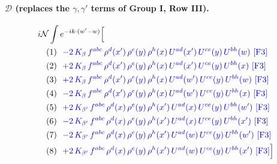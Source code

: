 \documentclass[10pt]{article}
\numberwithin{equation}{section}
\newcommand{\NN}{\mathcal N}
\begin{document}
\paragraph{$\mathcal D$ (replaces the $\gamma,\gamma'$ terms of Group I, Row III).}
\begin{align*}
&i\NN\int e^{-ik\cdot(w'-w)}\Big[\\
&\quad\text{(1)}\ \ \textcolor{blue}{-2\,K_{\beta}\,f^{abc}\,\rho^{d}(x')\,\rho^{e}(y)\,\rho^{h}(x)\,U^{ad}(x')\,U^{ce}(y)\,U^{bh}(w)}\ \text{\textcolor{blue}{[F3]}}\\
&\quad\text{(2)}\ \ \textcolor{blue}{+2\,K_{\beta}\,f^{abc}\,\rho^{d}(x')\,\rho^{e}(y)\,\rho^{h}(x)\,U^{ad}(x')\,U^{ce}(y)\,U^{bh}(x)}\ \text{\textcolor{blue}{[F3]}}\\
&\quad\text{(3)}\ \ \textcolor{blue}{+2\,K_{\beta}\,f^{abc}\,\rho^{d}(x')\,\rho^{e}(y)\,\rho^{h}(x)\,U^{ad}(w')\,U^{ce}(y)\,U^{bh}(w)}\ \text{\textcolor{blue}{[F3]}}\\
&\quad\text{(4)}\ \ \textcolor{blue}{-2\,K_{\beta}\,f^{abc}\,\rho^{d}(x')\,\rho^{e}(y)\,\rho^{h}(x)\,U^{ad}(w')\,U^{ce}(y)\,U^{bh}(x)}\ \text{\textcolor{blue}{[F3]}}\\
&\quad\text{(5)}\ \ \textcolor{blue}{+2\,K_{\beta'}\,f^{abc}\,\rho^{d}(x)\,\rho^{e}(y)\,\rho^{h}(x')\,U^{ad}(x)\,U^{ce}(y)\,U^{bh}(w')}\ \text{\textcolor{blue}{[F3]}}\\
&\quad\text{(6)}\ \ \textcolor{blue}{-2\,K_{\beta'}\,f^{abc}\,\rho^{d}(x)\,\rho^{e}(y)\,\rho^{h}(x')\,U^{ad}(x)\,U^{ce}(y)\,U^{bh}(x')}\ \text{\textcolor{blue}{[F3]}}\\
&\quad\text{(7)}\ \ \textcolor{blue}{-2\,K_{\beta'}\,f^{abc}\,\rho^{d}(x)\,\rho^{e}(y)\,\rho^{h}(x')\,U^{ad}(w)\,U^{ce}(y)\,U^{bh}(w')}\ \text{\textcolor{blue}{[F3]}}\\
&\quad\text{(8)}\ \ \textcolor{blue}{+2\,K_{\beta'}\,f^{abc}\,\rho^{d}(x)\,\rho^{e}(y)\,\rho^{h}(x')\,U^{ad}(w)\,U^{ce}(y)\,U^{bh}(x')}\ \text{\textcolor{blue}{[F3]}}\Big]
\end{align*}
\end{document}

